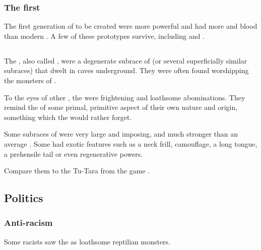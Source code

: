 \subsubsection{The first \scathae}
The first generation of \scathae{} to be created were more powerful and had more \draconian{} and \xsic{} blood than modern \scathae. A few of these prototypes survive, including  and . 









\subsection{\Tsutoras}
\index{\tsutora}
\index{\troglodyte}
The \tsutoras, also called \troglodytes, were a degenerate subrace of \demiscathae (or several superficially similar subraces) that dwelt in caves underground. 
They were often found worshipping the \daemonic{} monsters of . 

To the eyes of other \scathae, the \troglodytes{} were frightening and loathsome abominations. 
They remind the \scathae of some primal, primitive aspect of their own nature and origin, something which the \scathae would rather forget. 

Some subraces of \tsutoras were very large and imposing, and much stronger than an average \scatha. 
Some \tsutoras had exotic features such as a neck frill, camouflage, a long tongue, a prehensile tail or even regenerative powers. 

Compare them to the Tu-Tara from the game \cite{VideoGame:Torchlight}. 









\subsection{Politics}





\subsubsection{Anti-\scatha racism}
Some \human racists saw the \scathae as loathsome reptilian monsters. 

